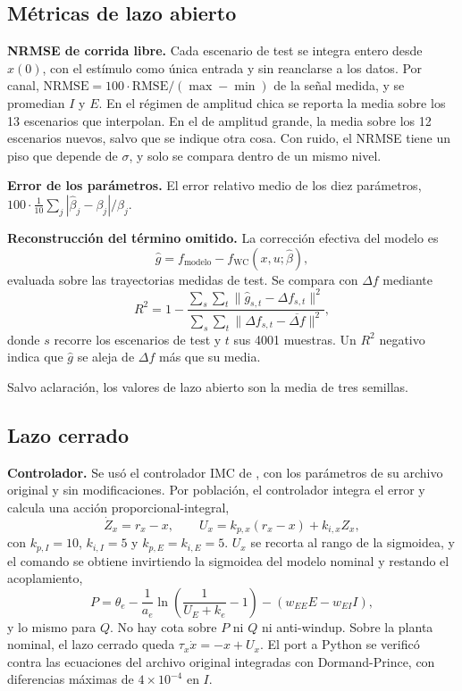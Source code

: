 \documentclass[11pt,a4paper]{article}
\newcommand{\bh}{\hat\beta}
\newcommand{\fwc}{f_{\mathrm{WC}}}
\begin{document}
\subsection{Métricas de lazo abierto}

\textbf{NRMSE de corrida libre.} Cada escenario de test se integra entero desde $x(0)$, con el estímulo como única entrada y sin reanclarse a los datos. Por canal, $\mathrm{NRMSE} = 100\cdot\mathrm{RMSE}/(\max - \min)$ de la señal medida, y se promedian $I$ y $E$. En el régimen de amplitud chica se reporta la media sobre los 13 escenarios que interpolan. En el de amplitud grande, la media sobre los 12 escenarios nuevos, salvo que se indique otra cosa. Con ruido, el NRMSE tiene un piso que depende de $\sigma$, y solo se compara dentro de un mismo nivel.

\textbf{Error de los parámetros.} El error relativo medio de los diez parámetros, $100\cdot\frac{1}{10}\sum_j |\bh_j - \beta_j|/\beta_j$.

\textbf{Reconstrucción del término omitido.} La corrección efectiva del modelo es
\[
\hat g = f_{\text{modelo}} - \fwc(x, u; \bh),
\]
evaluada sobre las trayectorias medidas de test. Se compara con $\Delta f$ mediante
\begin{equation}
R^2 = 1 - \frac{\sum_{s}\sum_{t}\big\|\hat g_{s,t} - \Delta f_{s,t}\big\|^2}{\sum_{s}\sum_{t}\big\|\Delta f_{s,t} - \overline{\Delta f}\big\|^2},
\end{equation}
donde $s$ recorre los escenarios de test y $t$ sus 4001 muestras. Un $R^2$ negativo indica que $\hat g$ se aleja de $\Delta f$ más que su media.

Salvo aclaración, los valores de lazo abierto son la media de tres semillas.

\subsection{Lazo cerrado}

\textbf{Controlador.} Se usó el controlador IMC de \cite{martinez2022ifac}, con los parámetros de su archivo original y sin modificaciones. Por población, el controlador integra el error y calcula una acción proporcional-integral,
\begin{equation}
\dot Z_x = r_x - x, \qquad U_x = k_{p,x}(r_x - x) + k_{i,x} Z_x,
\end{equation}
con $k_{p,I} = 10$, $k_{i,I} = 5$ y $k_{p,E} = k_{i,E} = 5$. $U_x$ se recorta al rango de la sigmoidea, y el comando se obtiene invirtiendo la sigmoidea del modelo nominal y restando el acoplamiento,
\begin{equation}
P = \theta_e - \frac{1}{a_e}\ln\!\left(\frac{1}{U_E + k_e} - 1\right) - (w_{EE}E - w_{EI}I),
\end{equation}
y lo mismo para $Q$. No hay cota sobre $P$ ni $Q$ ni anti-windup. Sobre la planta nominal, el lazo cerrado queda $\tau_x \dot x = -x + U_x$. El port a Python se verificó contra las ecuaciones del archivo original integradas con Dormand-Prince, con diferencias máximas de $4\times 10^{-4}$ en $I$.
\end{document}

